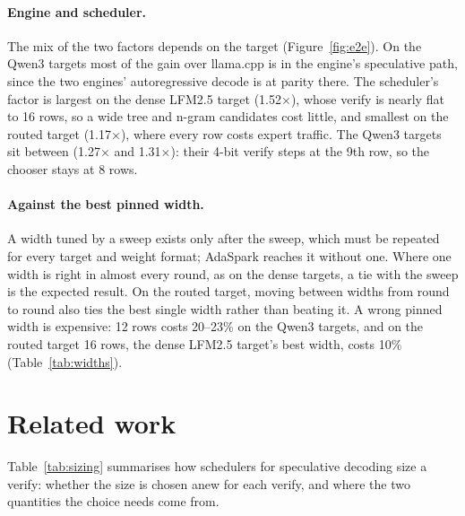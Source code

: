 \documentclass[10pt,twocolumn,letterpaper]{article}
\begin{document}
\paragraph{Engine and scheduler.} The mix of the two factors depends on the target (Figure~\ref{fig:e2e}). On the Qwen3 targets most of the gain over llama.cpp is in the engine's speculative path, since the two engines' autoregressive decode is at parity there. The scheduler's factor is largest on the dense LFM2.5 target (1.52$\times$), whose verify is nearly flat to 16 rows, so a wide tree and n-gram candidates cost little, and smallest on the routed target (1.17$\times$), where every row costs expert traffic. The Qwen3 targets sit between (1.27$\times$ and 1.31$\times$): their 4-bit verify steps at the 9th row, so the chooser stays at 8 rows.

\paragraph{Against the best pinned width.} A width tuned by a sweep exists only after the sweep, which must be repeated for every target and weight format; AdaSpark reaches it without one. Where one width is right in almost every round, as on the dense targets, a tie with the sweep is the expected result. On the routed target, moving between widths from round to round also ties the best single width rather than beating it. A wrong pinned width is expensive: 12 rows costs 20--23\% on the Qwen3 targets, and on the routed target 16 rows, the dense LFM2.5 target's best width, costs 10\% (Table~\ref{tab:widths}).

\section{Related work}\label{sec:6}

Table~\ref{tab:sizing} summarises how schedulers for speculative decoding size a verify: whether the size is chosen anew for each verify, and where the two quantities the choice needs come from.
\end{document}
